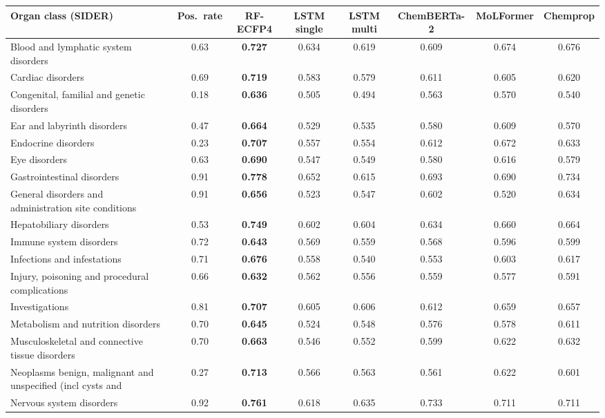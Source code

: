 \begin{tabular}{lccccccc}
\toprule
Organ class (SIDER) & Pos.\ rate & RF-ECFP4 & LSTM single & LSTM multi & ChemBERTa-2 & MoLFormer & Chemprop \\
\midrule
Blood and lymphatic system disorders & 0.63 & \textbf{0.727} & 0.634 & 0.619 & 0.609 & 0.674 & 0.676 \\
Cardiac disorders & 0.69 & \textbf{0.719} & 0.583 & 0.579 & 0.611 & 0.605 & 0.620 \\
Congenital, familial and genetic disorders & 0.18 & \textbf{0.636} & 0.505 & 0.494 & 0.563 & 0.570 & 0.540 \\
Ear and labyrinth disorders & 0.47 & \textbf{0.664} & 0.529 & 0.535 & 0.580 & 0.609 & 0.570 \\
Endocrine disorders & 0.23 & \textbf{0.707} & 0.557 & 0.554 & 0.612 & 0.672 & 0.633 \\
Eye disorders & 0.63 & \textbf{0.690} & 0.547 & 0.549 & 0.580 & 0.616 & 0.579 \\
Gastrointestinal disorders & 0.91 & \textbf{0.778} & 0.652 & 0.615 & 0.693 & 0.690 & 0.734 \\
General disorders and administration site conditions & 0.91 & \textbf{0.656} & 0.523 & 0.547 & 0.602 & 0.520 & 0.634 \\
Hepatobiliary disorders & 0.53 & \textbf{0.749} & 0.602 & 0.604 & 0.634 & 0.660 & 0.664 \\
Immune system disorders & 0.72 & \textbf{0.643} & 0.569 & 0.559 & 0.568 & 0.596 & 0.599 \\
Infections and infestations & 0.71 & \textbf{0.676} & 0.558 & 0.540 & 0.553 & 0.603 & 0.617 \\
Injury, poisoning and procedural complications & 0.66 & \textbf{0.632} & 0.562 & 0.556 & 0.559 & 0.577 & 0.591 \\
Investigations & 0.81 & \textbf{0.707} & 0.605 & 0.606 & 0.612 & 0.659 & 0.657 \\
Metabolism and nutrition disorders & 0.70 & \textbf{0.645} & 0.524 & 0.548 & 0.576 & 0.578 & 0.611 \\
Musculoskeletal and connective tissue disorders & 0.70 & \textbf{0.663} & 0.546 & 0.552 & 0.599 & 0.622 & 0.632 \\
Neoplasms benign, malignant and unspecified (incl cysts and  & 0.27 & \textbf{0.713} & 0.566 & 0.563 & 0.561 & 0.622 & 0.601 \\
Nervous system disorders & 0.92 & \textbf{0.761} & 0.618 & 0.635 & 0.733 & 0.711 & 0.711 \\

\end{tabular}
